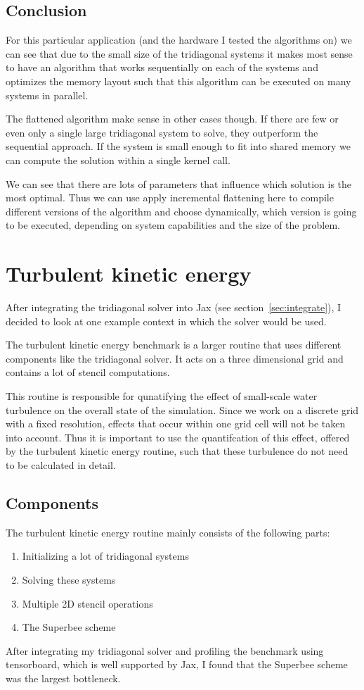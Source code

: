 \documentclass[a4paper,oneside]{memoir}
\begin{document}
\subsection{Conclusion}
For this particular application (and the hardware I tested the algorithms on) we can see that due to the small size of the tridiagonal systems it makes most sense to have an algorithm that works sequentially on each of the systems and optimizes the memory layout such that this algorithm can be executed on many systems in parallel. 

The flattened algorithm make sense in other cases though. If there are few or even only a single large tridiagonal system to solve, they outperform the sequential approach. If the system is small enough to fit into shared memory we can compute the solution within a single kernel call. 

We can see that there are lots of parameters that influence which solution is the most optimal. Thus we can use apply incremental flattening \cite{incremental} here to compile different versions of the algorithm and choose dynamically, which version is going to be executed, depending on system capabilities and the size of the problem.



\section{Turbulent kinetic energy}
After integrating the tridiagonal solver into Jax (see section~\ref{sec:integrate}), I decided to look at one example context in which the solver would be used.

The turbulent kinetic energy benchmark is a larger routine that uses different components like the tridiagonal solver. It acts on a three dimensional grid and contains a lot of stencil computations.

This routine is responsible for qunatifying the effect of small-scale water turbulence on the overall state of the simulation. Since we work on a discrete grid with a fixed resolution, effects that occur within one grid cell will not be taken into account. Thus it is important to use the quantifcation of this effect, offered by the turbulent kinetic energy routine, such that these turbulence do not need to be calculated in detail.

\subsection{Components}
The turbulent kinetic energy routine mainly consists of the following parts:
\begin{enumerate}
    \item Initializing a lot of tridiagonal systems
    \item Solving these systems 
    \item Multiple 2D stencil operations
    \item The Superbee scheme
\end{enumerate}
After integrating my tridiagonal solver and profiling the benchmark using tensorboard, which is well supported by Jax, I found that the Superbee scheme was the largest bottleneck.  
\end{document}
